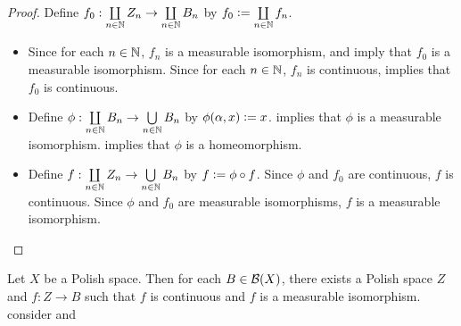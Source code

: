 \documentclass{book}
\begin{document}
	\begin{proof} Define $f_0: \coprod\limits_{n \in \mathbb{N}} Z_n \rightarrow \coprod\limits_{n \in \mathbb{N}}B_n$ by $f_0 \vcentcolon= \coprod\limits_{n \in \mathbb{N}} f_n$. 
		\begin{itemize}
			\item Since for each $n \in \mathbb{N}$, $f_n$ is a measurable isomorphism,  and   imply that $f_0$ is a measurable isomorphism. Since for each $n \in \mathbb{N}$, $f_n$ is continuous,  implies that $f_0$ is continuous.
			\item Define $\phi: \coprod\limits_{n \in \mathbb{N}} B_n \rightarrow \bigcup\limits_{n \in \mathbb{N}} B_n$ by $\phi(\alpha, x) \vcentcolon= x$.  implies that $\phi$ is a measurable isomorphism.  implies that $\phi$ is a homeomorphism. 
			\item Define $f: \coprod\limits_{n \in \mathbb{N}} Z_n \rightarrow \bigcup\limits_{n \in \mathbb{N}}B_n$ by $f \vcentcolon= \phi \circ f$. Since $\phi$ and $f_0$ are continuous, $f$ is continuous. Since $\phi$ and $f_0$ are measurable isomorphisms, $f$ is a measurable isomorphism.
		\end{itemize}
	\end{proof}

	\begin{ex} 
		Let $X$ be a Polish space. Then for each $B \in \mathcal{B}(X)$, there exists a Polish space $Z$ and $f:Z \rightarrow B$ such that $f$ is continuous and $f$ is a measurable isomorphism. \\
		 consider  and    
	\end{ex}
\end{document}
